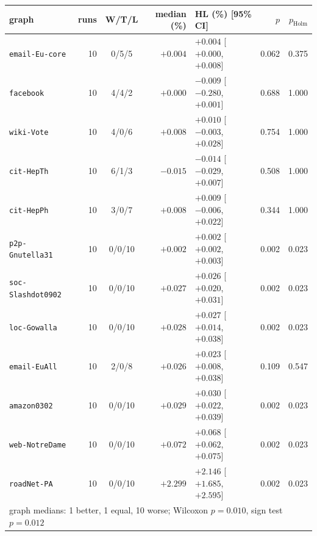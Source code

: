 \begin{tabular}{lrcrlrr}
\toprule
graph & runs & W/T/L & median (\%) & HL (\%) [95\% CI] & $p$ & $p_{\mathrm{Holm}}$ \\
\midrule
\texttt{email-Eu-core} & 10 & 0/5/5 & $+0.004$ & $+0.004$ [$+0.000$, $+0.008$] & 0.062 & 0.375 \\
\texttt{facebook} & 10 & 4/4/2 & $+0.000$ & $-0.009$ [$-0.280$, $+0.001$] & 0.688 & 1.000 \\
\texttt{wiki-Vote} & 10 & 4/0/6 & $+0.008$ & $+0.010$ [$-0.003$, $+0.028$] & 0.754 & 1.000 \\
\texttt{cit-HepTh} & 10 & 6/1/3 & $-0.015$ & $-0.014$ [$-0.029$, $+0.007$] & 0.508 & 1.000 \\
\texttt{cit-HepPh} & 10 & 3/0/7 & $+0.008$ & $+0.009$ [$-0.006$, $+0.022$] & 0.344 & 1.000 \\
\texttt{p2p-Gnutella31} & 10 & 0/0/10 & $+0.002$ & $+0.002$ [$+0.002$, $+0.003$] & 0.002 & 0.023 \\
\texttt{soc-Slashdot0902} & 10 & 0/0/10 & $+0.027$ & $+0.026$ [$+0.020$, $+0.031$] & 0.002 & 0.023 \\
\texttt{loc-Gowalla} & 10 & 0/0/10 & $+0.028$ & $+0.027$ [$+0.014$, $+0.038$] & 0.002 & 0.023 \\
\texttt{email-EuAll} & 10 & 2/0/8 & $+0.026$ & $+0.023$ [$+0.008$, $+0.038$] & 0.109 & 0.547 \\
\texttt{amazon0302} & 10 & 0/0/10 & $+0.029$ & $+0.030$ [$+0.022$, $+0.039$] & 0.002 & 0.023 \\
\texttt{web-NotreDame} & 10 & 0/0/10 & $+0.072$ & $+0.068$ [$+0.062$, $+0.075$] & 0.002 & 0.023 \\
\texttt{roadNet-PA} & 10 & 0/0/10 & $+2.299$ & $+2.146$ [$+1.685$, $+2.595$] & 0.002 & 0.023 \\
\midrule
\multicolumn{7}{l}{graph medians: 1 better, 1 equal, 10 worse; Wilcoxon $p=0.010$, sign test $p=0.012$} \\
\bottomrule
\end{tabular}
